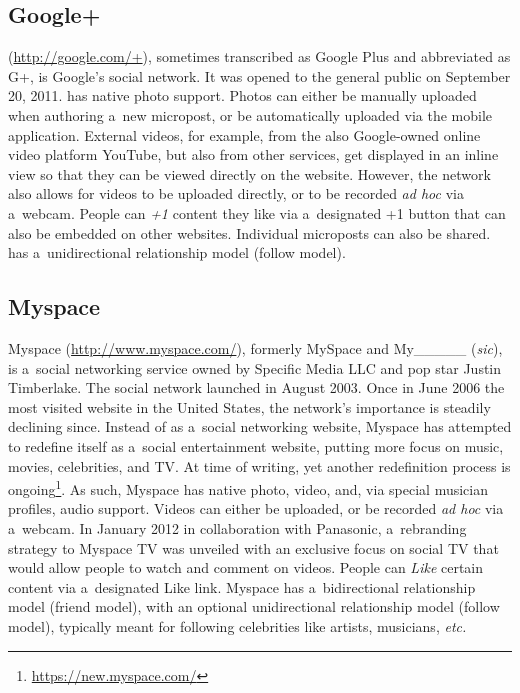 \subsection{Google+}

\googleplus (\url{http://google.com/+}),
sometimes transcribed as Google Plus
and abbreviated as G+, is Google's social network.
It was opened to the general public on September 20, 2011.
\googleplus has native photo support.
Photos can either be manually uploaded
when authoring a~new micropost,
or be automatically uploaded via the \googleplus
mobile application.
External videos, for example, from
the also Google-owned online video platform YouTube,
but also from other services,
get displayed in an inline view
so that they can be viewed directly on the website.
However, the network also allows for
videos to be uploaded directly,
or to be recorded \emph{ad hoc} via a~webcam.
People can \emph{+1} content they like via a~designated +1 button
that can also be embedded on other websites.
Individual microposts can also be shared.
\googleplus has a~unidirectional relationship model
(follow model).

\subsection{Myspace}

Myspace (\url{http://www.myspace.com/}),
formerly MySpace and My\_\_\_\_\_ (\emph{sic}), is
a~social networking service owned by Specific Media LLC
and pop star Justin Timberlake.
The social network launched in August 2003.
Once in June 2006 the most visited website in the United States,
the network's importance is steadily declining since.
Instead of as a~social networking website,
Myspace has attempted to redefine itself
as a~social entertainment website,
putting more focus on music, movies, celebrities, and TV.
At time of writing, yet another redefinition process is
ongoing\footnote{\url{https://new.myspace.com/}}.
As such, Myspace has native photo, video, and,
via special musician profiles, audio support.
Videos can either be uploaded,
or be recorded \emph{ad hoc} via a~webcam.
In January 2012 in collaboration with Panasonic,
a~rebranding strategy to Myspace TV was unveiled
with an exclusive focus on social TV that would allow people
to watch and comment on videos.
People can \emph{Like} certain content via a~designated Like link.
Myspace has a~bidirectional relationship model (friend model),
with an optional unidirectional relationship model (follow model),
typically meant for following celebrities like artists,
musicians, \emph{etc.}

